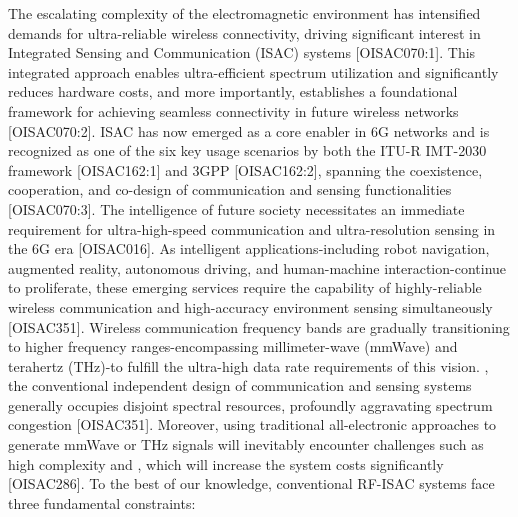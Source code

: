\markdownRendererDocumentBegin
\markdownRendererSectionBegin
{}\markdownRendererInterblockSeparator
{}\markdownRendererSectionBegin
{}\markdownRendererInterblockSeparator
{}The escalating complexity of the electromagnetic environment has intensified demands for ultra-reliable wireless connectivity, driving significant interest in Integrated Sensing and Communication (ISAC) systems [O\markdownRendererUnderscore{}ISAC\markdownRendererUnderscore{}070:1]. This integrated approach enables ultra-efficient spectrum utilization and significantly reduces hardware costs, and more importantly, establishes a foundational framework for achieving seamless connectivity in future wireless networks [O\markdownRendererUnderscore{}ISAC\markdownRendererUnderscore{}070:2]. ISAC has now emerged as a core enabler in 6G networks and is recognized as one of the six key usage scenarios by both the ITU-R IMT-2030 framework [O\markdownRendererUnderscore{}ISAC\markdownRendererUnderscore{}162:1] and 3GPP [O\markdownRendererUnderscore{}ISAC\markdownRendererUnderscore{}162:2], spanning the coexistence, cooperation, and co-design of communication and sensing functionalities [O\markdownRendererUnderscore{}ISAC\markdownRendererUnderscore{}070:3].\markdownRendererParagraphSeparator
{}The intelligence of future society necessitates an immediate requirement for ultra-high-speed communication and ultra-resolution sensing in the 6G era [O\markdownRendererUnderscore{}ISAC\markdownRendererUnderscore{}016]. As intelligent applications-including robot navigation, augmented reality, autonomous driving, and human-machine interaction-continue to proliferate, these emerging services require the capability of highly-reliable wireless communication and high-accuracy environment sensing simultaneously [O\markdownRendererUnderscore{}ISAC\markdownRendererUnderscore{}351]. Wireless communication frequency bands are gradually transitioning to higher frequency ranges-encompassing millimeter-wave (mmWave) and terahertz (THz)-to fulfill the ultra-high data rate requirements of this vision. , the conventional independent design of communication and sensing systems generally occupies disjoint spectral resources, profoundly aggravating spectrum congestion [O\markdownRendererUnderscore{}ISAC\markdownRendererUnderscore{}351]. Moreover, using traditional all-electronic approaches to generate mmWave or THz signals will inevitably encounter challenges such as high complexity and , which will increase the system costs significantly [O\markdownRendererUnderscore{}ISAC\markdownRendererUnderscore{}286]. To the best of our knowledge, conventional RF-ISAC systems face three fundamental constraints:\markdownRendererInterblockSeparator
